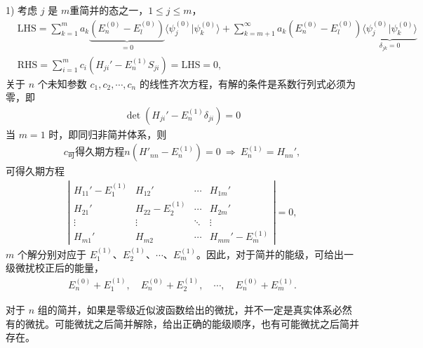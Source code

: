 1) 考虑 $j$ 是 $m$重简并的态之一，$1 \leqslant j \leqslant m$，
\begin{align}
    &\text{LHS} = 
    \sum_{k=1}^m a_k 
    \underbrace{(E_n^{(0)} - E_l^{(0)})}_{=0}
    \langle \psi_j^{(0)} | \psi_k^{(0)} \rangle
    +
    \sum_{k=m+1}^\infty a_k 
    (E_n^{(0)} - E_l^{(0)})
    \underbrace{\langle \psi_j^{(0)} | \psi_k^{(0)} \rangle}_{\delta_{jk}=0}
    \\
    &\text{RHS} = \sum_{i=1}^{m} c_i (H_{ji}' - E_n^{(1)}S_{ji}) = \text{LHS} = 0,
\end{align}
关于 $n$ 个未知参数 $c_1, c_2, \cdots, c_n$ 的线性齐次方程，有解的条件是系数行列式必须为零，即
\begin{align}
    \det\left(H_{ji}' - E_n^{(1)} \delta_{ji}\right) = 0
\end{align}
当 $m = 1$ 时，即同归非简并体系，则
\begin{align}
    c_可得久期方程n (H'_{nn} - E_n^{(1)}) = 0 \ \Rightarrow \ E_n^{(1)} = H_{nn}', 
\end{align}
可得久期方程
\begin{align}
    \left|\begin{matrix}
        H_{11}' - E_1^{(1)} & H_{12}' & \cdots & H_{1m}' \\
        H_{21}' & H_{22} - E_2^{(1)} & \cdots & H_{2m}' \\
        \vdots & \vdots & \ddots & \vdots \\
        H_{m1}' & H_{m2} & \cdots & H_{mm}' - E_m^{(1)}
    \end{matrix}
    \right|=0,
\end{align}
$m$ 个解分别对应于 $E_1^{(1)}$、$E_2^{(1)}$、$\cdots$、$E_m^{(1)}$。因此，对于简并的能级，可给出一级微扰校正后的能量，
\begin{align}
    E_n^{(0)}+E_1^{(1)}, \quad E_n^{(0)}+E_2^{(1)}, \quad\cdots,\quad E_n^{(0)}+E_m^{(1)}. 
\end{align}

对于 $n$ 组的简并，如果是零级近似波函数给出的微扰，并不一定是真实体系必然有的微扰。可能微扰之后简并解除，给出正确的能级顺序，也有可能微扰之后简并存在。

